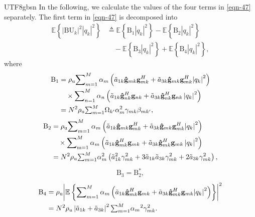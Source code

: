 \documentclass[lettersize,journal]{IEEEtran}
\begin{document}
\begin{CJK}{UTF8}{gbsn}
In the following, we calculate the values of the four terms in \eqref{eqn-47} separately.
The first term in \eqref{eqn-47} is decomposed into
\begin{align}\label{eqn-48}\mathbb{E}\left\{ {{{\left| {\text{BU}_k} \right|}^2}{{\left| {{q_k}} \right|}^2}} \right\} &\triangleq \mathbb{E}\left\{ {{{\text{B}_1}{\left| {{q_k}} \right|}^2}} \right\} - \mathbb{E}\left\{ {{{\text{B}_2}{\left| {{q_k}} \right|}^2}} \right\} \nonumber \\
&\quad- \mathbb{E}\left\{ {{{\text{B}_3}{\left| {{q_k}} \right|}^2}} \right\} + \mathbb{E}\left\{ {{{\text{B}_4}{\left| {{q_k}} \right|}^2}} \right\},\end{align}
where
\begin{align}{\text{B}_1} &= {\rho _\text{u}} { \mathop\sum\nolimits_{m = 1}^M {\alpha _m}\left(\tilde{a}_{1k}{{{\bf{\hat g}}}_{mk}}{\bf{g}}_{mk}^H + \tilde{a}_{3k}{{{\bf{\hat g}}}_{mk}}{\bf{g}}_{mk}^H{{\left| {{q_k}} \right|}^2}\right)}\nonumber \\
&\quad \times{\mathop\sum\nolimits_{n = 1}^M {\alpha _n}\left({\tilde{a}_{1k}}{\bf{\hat g}}_{nk}^H{{\bf{g}}_{nk}} + {\tilde{a}_{3k}}{\bf{\hat g}}_{nk}^H{{\bf{g}}_{nk}}\left | q_k \right |^2 \right)}\nonumber\\
&={N^2}{\rho _\text{u}} {\textstyle \sum_{m=1}^{M}}  {\Omega _{k'} \alpha _m^2{\gamma _{mk}}{\beta _{mk'}}},\end{align}
\begin{align}{\text{B}_2} &= {\rho _\text{u}} {\mathop \sum \nolimits_{m = 1}^M {\alpha _m}\left(\tilde{a}_{1k}{{{\bf{\hat g}}}_{mk}}{\bf{g}}_{mk}^H + \tilde{a}_{3k}{{{\bf{\hat g}}}_{mk}}{\bf{g}}_{mk}^H{{\left| {{q_k}} \right|}^2}\right)}\nonumber \\
&\quad \times {\mathop \sum \nolimits_{{\rm{m}} = 1}^M {\alpha _m}\left({\tilde{a}_{1k}}{\bf{\hat g}}_{mk}^H{{\bf{g}}_{mk}} + {\tilde{a}_{3k}}{\bf{\hat g}}_{mk}^H{{\bf{g}}_{mk}}\left | q_k \right |^2 \right)}\nonumber\\
&=N^2\rho _u {\textstyle \sum_{m=1}^{M}} \alpha _m^2\left ( \tilde{a}_{1k}^2\gamma _{mk}^2+3\tilde{a}_{1k}\tilde{a}_{3k}\gamma _{mk}^2 +2\tilde{a}_{3k}\gamma _{mk}^2   \right ) , \end{align}
\begin{equation}\begin{aligned}{\text{B}_3} = \text{B}_2^*,\end{aligned}\end{equation}
\begin{align}{\text{B}_4} &= {\rho _\text{u}}{\left| {\mathbb{E}\left\{ {\mathop \sum \nolimits_{m = 1}^M {\alpha _m}\left({\tilde{a}_{1k}}{\bf{\hat g}}_{mk}^H{{\bf{g}}_{mk}} + {\tilde{a}_{3k}}{\bf{\hat g}}_{mk}^H{{\bf{g}}_{mk}}{{\left| {{q_k}} \right|}^2}\right)} \right\}} \right|^2}\nonumber\\
&=N^2\rho _u\left | {\tilde{a}_{1k}} + {\tilde{a}_{3k}} \right |^2 { {\textstyle \sum_{m=1}^{M}}  {\alpha _m}^2{\gamma _{mk}^2}}.\end{align}


\end{CJK}
\end{document}
